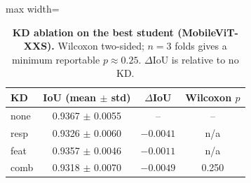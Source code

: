 \begin{table}[ht]
\centering
\caption{\textbf{KD ablation on the best student (MobileViT-XXS).} Wilcoxon two-sided; $n=3$ folds gives a minimum reportable $p \approx 0.25$. $\Delta$IoU is relative to no KD.}
\label{tab:t3-kd-ablation}
\small
\setlength{\tabcolsep}{4pt}
\begin{adjustbox}{max width=\textwidth}
\begin{tabular}{lccc}
\toprule
\textbf{KD} & \textbf{IoU (mean $\pm$ std)} & \textbf{$\Delta$IoU} & \textbf{Wilcoxon $p$} \\
\midrule
none      & 0.9367 $\pm$ 0.0055 & --      & -- \\
resp      & 0.9326 $\pm$ 0.0060 & $-0.0041$ & n/a \\
feat      & 0.9357 $\pm$ 0.0046 & $-0.0011$ & n/a \\
comb      & 0.9318 $\pm$ 0.0070 & $-0.0049$ & 0.250 \\
\bottomrule
\end{tabular}
\end{adjustbox}
\end{table}

